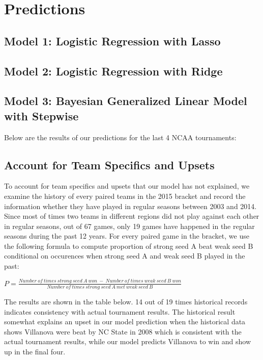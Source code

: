 \documentclass{article} %
\begin{document}
\section{Predictions}

\subsection{Model 1: Logistic Regression with Lasso}

\subsection{Model 2: Logistic Regression with Ridge}

\subsection{Model 3: Bayesian Generalized Linear Model with Stepwise}

Below are the results of our predictions for the last 4 NCAA tournaments:\





\subsection{Account for Team Specifics and Upsets}

To account for team specifics and upsets that our model has not explained, we examine the history of every paired teams in the 2015 bracket and record the information whether they have played in regular seasons between 2003 and 2014. Since most of times two teams in different regions did not play against each other in regular seasons, out of 67 games, only 19 games have happened in the regular seasons during the past 12 years. For every paired game in the bracket, we use the following formula to compute proportion of strong seed A beat weak seed B conditional on occurences when strong seed A and weak seed B played in the past:

$P=\frac{Number \ of \ times \ strong \ seed \ A \ won \ - \ Number \ of \ times \ weak \ seed \ B \ won}{Number \ of \ times \ strong \ seed \ A \ met \ weak \ seed \ B }$


The results are shown in the table below. 14 out of 19 times historical records indicates consistency with actual tournament results. The historical result somewhat explains an upset in our model prediction when the historical data shows Villanova were beat by NC State in 2008 which is consistent with the actual tournament results, while our model predicts Villanova to win and show up in the final four. 
\end{document}
